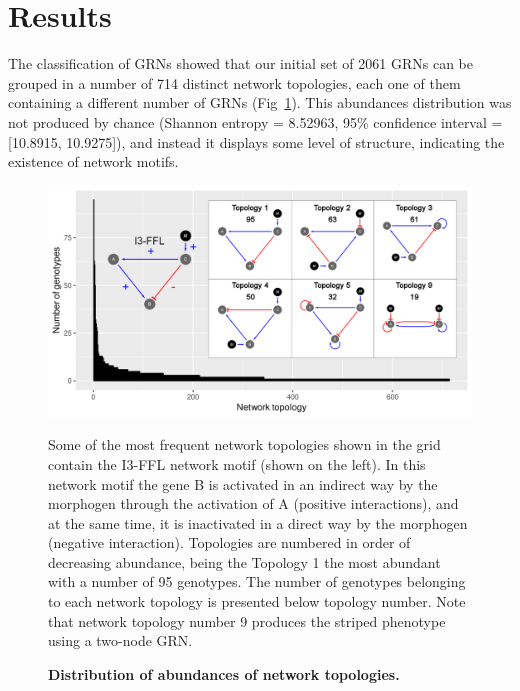 \documentclass[10pt,letterpaper]{article}
\begin{document}


\section*{Results}

The classification of GRNs showed that our initial set of 2061 GRNs can be
grouped in a number of 714 distinct network topologies, each one of them
containing a different number of GRNs (Fig~\ref{fig:distopol}). This abundances
distribution was not produced by chance (Shannon entropy = 8.52963, 95\%
confidence interval = [10.8915, 10.9275]), and instead it displays some level
of structure, indicating the existence of network motifs.

\begin{figure}[!h]
 \includegraphics[width=\textwidth]{figures/results/Fig2}
 \caption{\bf Distribution of abundances of network topologies.}
 Some of the most frequent network topologies shown in the grid
 contain the I3-FFL network motif (shown on the left). In this network
 motif the gene B is activated in an indirect way by the morphogen through
 the activation of A (positive interactions), and at the same time, it
 is inactivated in a direct way by the morphogen (negative interaction).
 Topologies are numbered in order of decreasing abundance, being the
 Topology 1 the most abundant with a number of 95 genotypes. The number of
 genotypes belonging to each network topology is presented below
 topology number.
 Note that network topology number 9 produces the striped phenotype using a
 two-node GRN.
 \label{fig:distopol}
\end{figure}
\end{document}

